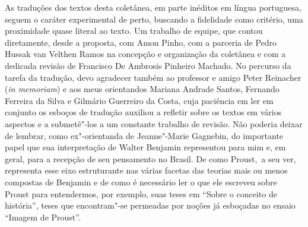 As traduções dos textos desta coletânea, em parte inéditos em língua
portuguesa, seguem o caráter experimental de perto, buscando a fidelidade
como critério, uma proximidade quase literal ao texto. Um trabalho de
equipe, que contou diretamente, desde a proposta, com Amon Pinho, com a
parceria de Pedro Hussak van Velthen Ramos na concepção e organização da coletânea e com a
dedicada revisão de Francisco De Ambrosis Pinheiro Machado. No percurso
da tarefa da tradução, devo agradecer também ao professor e amigo Peter
Reinacher (\emph{in memoriam}) e aos meus orientandos Mariana Andrade Santos, Fernando
Ferreira da Silva e Gilmário Guerreiro da Costa, cuja paciência em ler
em conjunto os esboços de tradução auxiliou a refletir sobre os
textos em vários aspectos e a submetê"-los a um constante trabalho de
revisão. Não poderia deixar de lembrar, como ex"-orientanda de Jeanne"-Marie Gagnebin, do importante papel que sua interpretação de Walter Benjamin representou para mim e, em geral, para a recepção de seu pensamento no Brasil. De como Proust,~a seu ver, representa esse eixo estruturante nas várias facetas das teorias mais ou menos compostas de Benjamin e de como é necessário ler o que ele escreveu sobre Proust para entendermos, por exemplo, suas teses em ``Sobre o conceito de história'', teses que encontram"-se permeadas por noções já esboçadas no ensaio ``Imagem de Proust''. 
